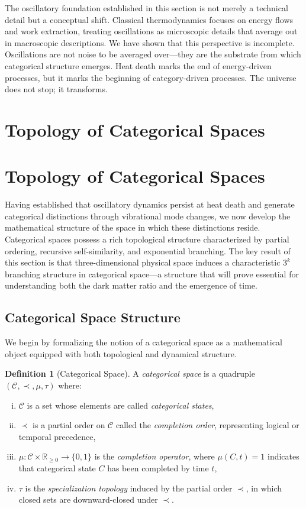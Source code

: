 \documentclass[12pt,a4paper]{article}
\theoremstyle{definition}
\newtheorem{definition}[theorem]{Definition}
\theoremstyle{remark}
\begin{document}
The oscillatory foundation established in this section is not merely a technical detail but a conceptual shift. Classical thermodynamics focuses on energy flows and work extraction, treating oscillations as microscopic details that average out in macroscopic descriptions. We have shown that this perspective is incomplete. Oscillations are not noise to be averaged over—they are the substrate from which categorical structure emerges. Heat death marks the end of energy-driven processes, but it marks the beginning of category-driven processes. The universe does not stop; it transforms.


\section{Topology of Categorical Spaces}
\label{sec:topology}
\section{Topology of Categorical Spaces}
\label{sec:topology}

Having established that oscillatory dynamics persist at heat death and generate categorical distinctions through vibrational mode changes, we now develop the mathematical structure of the space in which these distinctions reside. Categorical spaces possess a rich topological structure characterized by partial ordering, recursive self-similarity, and exponential branching. The key result of this section is that three-dimensional physical space induces a characteristic $3^k$ branching structure in categorical space—a structure that will prove essential for understanding both the dark matter ratio and the emergence of time.

\subsection{Categorical Space Structure}

We begin by formalizing the notion of a categorical space as a mathematical object equipped with both topological and dynamical structure.

\begin{definition}[Categorical Space]
\label{def:categorical_space}
A \emph{categorical space} is a quadruple $(\mathcal{C}, \prec, \mu, \tau)$ where:
\begin{enumerate}[(i)]
    \item $\mathcal{C}$ is a set whose elements are called \emph{categorical states},
    \item $\prec$ is a partial order on $\mathcal{C}$ called the \emph{completion order}, representing logical or temporal precedence,
    \item $\mu: \mathcal{C} \times \mathbb{R}_{\geq 0} \to \{0, 1\}$ is the \emph{completion operator}, where $\mu(C, t) = 1$ indicates that categorical state $C$ has been completed by time $t$,
    \item $\tau$ is the \emph{specialization topology} induced by the partial order $\prec$, in which closed sets are downward-closed under $\prec$.
\end{enumerate}
\end{definition}
\end{document}
